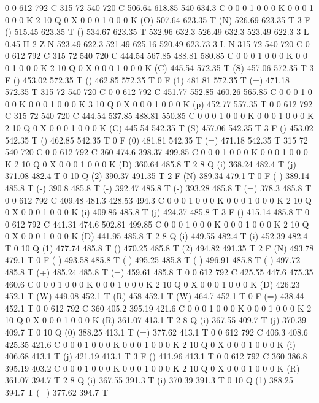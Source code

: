 0 0 612 792 C
315 72 540 720 C
506.64 618.85 540 634.3 C
0 0 0 1 0 0 0 K
0 0 0 1 0 0 0 K
2 10 Q
0 X
0 0 0 1 0 0 0 K
(O) 507.64 623.35 T
(N) 526.69 623.35 T
3 F
() 515.45 623.35 T
() 534.67 623.35 T
532.96 632.3 526.49 632.3 523.49 622.3 3 L
0.45 H
2 Z
N
523.49 622.3 521.49 625.16 520.49 623.73 3 L
N
315 72 540 720 C
0 0 612 792 C
315 72 540 720 C
444.54 567.85 488.81 580.85 C
0 0 0 1 0 0 0 K
0 0 0 1 0 0 0 K
2 10 Q
0 X
0 0 0 1 0 0 0 K
(C) 445.54 572.35 T
(S) 457.06 572.35 T
3 F
() 453.02 572.35 T
() 462.85 572.35 T
0 F
(1) 481.81 572.35 T
(=) 471.18 572.35 T
315 72 540 720 C
0 0 612 792 C
451.77 552.85 460.26 565.85 C
0 0 0 1 0 0 0 K
0 0 0 1 0 0 0 K
3 10 Q
0 X
0 0 0 1 0 0 0 K
(p) 452.77 557.35 T
0 0 612 792 C
315 72 540 720 C
444.54 537.85 488.81 550.85 C
0 0 0 1 0 0 0 K
0 0 0 1 0 0 0 K
2 10 Q
0 X
0 0 0 1 0 0 0 K
(C) 445.54 542.35 T
(S) 457.06 542.35 T
3 F
() 453.02 542.35 T
() 462.85 542.35 T
0 F
(0) 481.81 542.35 T
(=) 471.18 542.35 T
315 72 540 720 C
0 0 612 792 C
360 474.6 398.37 499.85 C
0 0 0 1 0 0 0 K
0 0 0 1 0 0 0 K
2 10 Q
0 X
0 0 0 1 0 0 0 K
(D) 360.64 485.8 T
2 8 Q
(i) 368.24 482.4 T
(j) 371.08 482.4 T
0 10 Q
(2) 390.37 491.35 T
2 F
(N) 389.34 479.1 T
0 F
(-) 389.14 485.8 T
(-) 390.8 485.8 T
(-) 392.47 485.8 T
(-) 393.28 485.8 T
(=) 378.3 485.8 T
0 0 612 792 C
409.48 481.3 428.53 494.3 C
0 0 0 1 0 0 0 K
0 0 0 1 0 0 0 K
2 10 Q
0 X
0 0 0 1 0 0 0 K
(i) 409.86 485.8 T
(j) 424.37 485.8 T
3 F
() 415.14 485.8 T
0 0 612 792 C
441.31 474.6 502.81 499.85 C
0 0 0 1 0 0 0 K
0 0 0 1 0 0 0 K
2 10 Q
0 X
0 0 0 1 0 0 0 K
(D) 441.95 485.8 T
2 8 Q
(i) 449.55 482.4 T
(i) 452.39 482.4 T
0 10 Q
(1) 477.74 485.8 T
() 470.25 485.8 T
(2) 494.82 491.35 T
2 F
(N) 493.78 479.1 T
0 F
(-) 493.58 485.8 T
(-) 495.25 485.8 T
(-) 496.91 485.8 T
(-) 497.72 485.8 T
(+) 485.24 485.8 T
(=) 459.61 485.8 T
0 0 612 792 C
425.55 447.6 475.35 460.6 C
0 0 0 1 0 0 0 K
0 0 0 1 0 0 0 K
2 10 Q
0 X
0 0 0 1 0 0 0 K
(D) 426.23 452.1 T
(W) 449.08 452.1 T
(R) 458 452.1 T
(W) 464.7 452.1 T
0 F
(=) 438.44 452.1 T
0 0 612 792 C
360 405.2 395.19 421.6 C
0 0 0 1 0 0 0 K
0 0 0 1 0 0 0 K
2 10 Q
0 X
0 0 0 1 0 0 0 K
(R) 361.07 413.1 T
2 8 Q
(i) 367.55 409.7 T
(j) 370.39 409.7 T
0 10 Q
(0) 388.25 413.1 T
(=) 377.62 413.1 T
0 0 612 792 C
406.3 408.6 425.35 421.6 C
0 0 0 1 0 0 0 K
0 0 0 1 0 0 0 K
2 10 Q
0 X
0 0 0 1 0 0 0 K
(i) 406.68 413.1 T
(j) 421.19 413.1 T
3 F
() 411.96 413.1 T
0 0 612 792 C
360 386.8 395.19 403.2 C
0 0 0 1 0 0 0 K
0 0 0 1 0 0 0 K
2 10 Q
0 X
0 0 0 1 0 0 0 K
(R) 361.07 394.7 T
2 8 Q
(i) 367.55 391.3 T
(i) 370.39 391.3 T
0 10 Q
(1) 388.25 394.7 T
(=) 377.62 394.7 T
